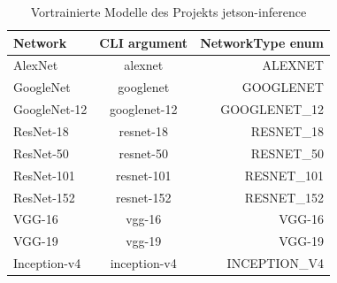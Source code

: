 \begin{table}
    \centering
    \begin{tabular}[h]{lcr}
        \textbf{Network}              & \textbf{CLI argument} & \textbf{NetworkType enum} \\ \hline
        AlexNet\index{AlexNet}        & alexnet               & ALEXNET \\
        GoogleNet\index{GoogleNet}    & googlenet             & GOOGLENET \\
        GoogleNet-12                  & googlenet-12          & GOOGLENET\_12 \\
        ResNet-18\index{ResNets}      & resnet-18             & RESNET\_18 \\
        ResNet-50                     & resnet-50             & RESNET\_50 \\
        ResNet-101                    & resnet-101            & RESNET\_101 \\
        ResNet-152                    & resnet-152            & RESNET\_152 \\
        VGG-16\index{VGG}             & vgg-16                & VGG-16 \\
        VGG-19                        & vgg-19                & VGG-19 \\
        Inception-v4\index{Inception} & inception-v4          & INCEPTION\_V4 \\
    \end{tabular}
    \caption{Vortrainierte Modelle des Projekts jetson-inference}\label{Database:TrainedModell}
\end{table}







%


